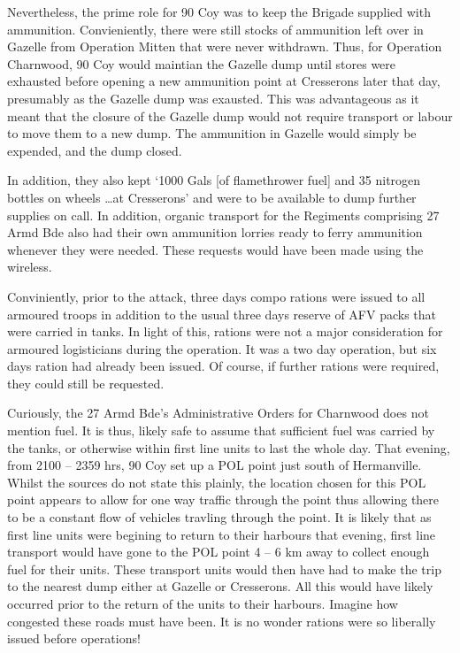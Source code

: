 \documentclass[noraggedright]{turabian-researchpaper}
\newcommand{\CharnAdm}{27 Armd Bde Adm Order No. 7, 7 July 1944}
\begin{document}
Nevertheless, the prime role for 90 Coy was to keep the Brigade supplied
with ammunition.  Convieniently, there were still stocks of ammunition left
over in Gazelle from Operation Mitten that were never withdrawn.  Thus, for
Operation Charnwood, 90 Coy would maintian the Gazelle dump until stores 
were exhausted before opening a new ammunition point at Cresserons later 
that day, presumably as the Gazelle dump was exausted.\autocites[\CharnAdm]
{27wd}[8 July 1944]{90wd}
This was advantageous as it meant that the closure of the Gazelle dump would 
not require transport or labour to move them to a new dump.  The ammunition 
in Gazelle would simply be expended, and the dump closed.  

In addition, they also kept `1000 Gals [of flamethrower fuel]
and 35 nitrogen bottles on wheels \ldots at Cresserons' and were to be
available to dump further supplies on call.\autocite[\CharnAdm][Para 6]
{27wd} In addition, organic transport for the Regiments comprising 27 Armd
Bde also had their own ammunition lorries ready to ferry ammunition whenever
they were needed.  These requests would have been made using the 
wireless.\autocite[13th/18th Royal Hussars Operation Order No. 1, Operation
Charnwood (See July appendix)][Para 9b]{1318wd}

Conviniently, prior to the attack, three days compo rations were issued to
all armoured troops in addition to the usual three days reserve of AFV
packs that were carried in tanks.\autocite[\CharnAdm][Para 7]{27wd}  
In light of this, rations were not a 
major consideration for armoured logisticians during the operation.  It was
a two day operation, but six days ration had already been issued.  Of course,
if further rations were required, they could still be requested.

Curiously, the 27 Armd Bde's Administrative Orders for Charnwood does not
mention fuel.  It is thus, likely safe to assume that sufficient fuel was
carried by the tanks, or otherwise within first line units to last the whole
day.  That evening, from 2100 -- 2359 hrs,
90 Coy set up a POL point just south of Hermanville.\autocite[8 July 1944]
{90wd}
Whilst the sources do not state this plainly, the location chosen for this
POL point appears to allow for one way traffic through the point thus allowing
there to be a constant flow of vehicles travling through the point.  It is 
likely that as first line units were begining to return to their harbours that 
evening, first line transport would have gone to the POL point 4 -- 6 km away 
to collect enough fuel for their units.  These transport units would then have 
had to make the trip to the nearest dump either at Gazelle or Cresserons.  All
this would have likely occurred prior to the return of the units to their 
harbours.
Imagine how congested these roads must have been.  It is no wonder rations 
were so liberally issued before operations!   
\end{document}
